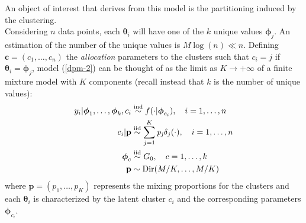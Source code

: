 An object of interest that derives from this model is the partitioning induced by the clustering. \\%
Considering $n$ data points, each $\boldsymbol\theta_i$ will have one of the $k$ unique values $\boldsymbol\phi_{j}$.
An estimation of the number of the unique values is $M\log(n) \ll n$.
Defining  $\boldsymbol c= (c_1,\dots,c_n)$ the \emph{allocation} parameters to the clusters such that $c_i = j$ if $\boldsymbol\theta_i = \boldsymbol\phi_j$, model (\ref{dpm-2}) can be thought of as the limit as $K \to +\infty$  of a finite mixture model with $K$ components (recall instead that $k$ is the number of unique values):
\begin{equation}
	\begin{aligned}\label{dpm-disc}
		y_{i}|\boldsymbol{\phi}_1,\dots,\boldsymbol{\phi}_k,c_{i} &\stackrel{\text{ind}}{\sim} f(\cdot|\boldsymbol\phi_{c_{i}}), \quad i=1,\dots,n \\
		c_{i}|\mathit{\mathbf{p}}&\stackrel{\text{iid}}{\sim} \sum_{j=1}^K\mathit{p_j} \delta_j(\cdot), \quad i=1,\dots,n \\
		\boldsymbol\phi_{c} & \stackrel{\text{iid}}{\sim} G_{0}, \quad c=1,\dots,k \\
		\mathbf{p} &\sim \operatorname{Dir}(M/K,\dots,M/K)
	\end{aligned}
\end{equation}
where $\mathbf{p}=(p_1,\dots,p_K)$ represents the mixing proportions for the clusters and each $\boldsymbol\theta_i$ is characterized by the latent cluster $c_i$ and the corresponding parameters $\boldsymbol\phi_{c_i}$.

